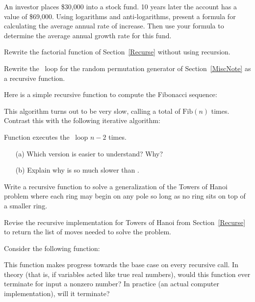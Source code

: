\begin{exercises}
\item
An investor places \$30,000 into a stock fund.
10 years later the account has a value of \$69,000.
Using logarithms and anti-logarithms, present a
formula for calculating the average annual rate of increase.
Then use your formula to determine the average annual growth rate for
this fund.

\item
Rewrite the factorial function of Section~\ref{Recurse} without
using recursion.

\item
Rewrite the \Cfor\ loop for the random permutation generator of
Section~\ref{MiscNote} as a recursive function.

\item
\label{FiboEx}
Here is a simple recursive function to compute the
Fibonacci sequence:


\noindent This algorithm turns out to be very slow, calling
 a total of \(\mbox{Fib}(n)\) times.
Contrast this with the following iterative
algorithm:


\noindent Function  executes the \Cfor\ loop \(n-2\)
times.
\begin{enumerate}
\item[(a)] Which version is easier to understand? Why?
\item[(b)] Explain why  is so much slower than .
\end{enumerate}

\item
Write a recursive function to solve a generalization
of the Towers of Hanoi problem where each ring may begin on any pole
so long as no ring sits on top of a smaller ring.

\item
Revise the recursive implementation for Towers of Hanoi from
Section~\ref{Recurse} to return the list of moves needed to solve the
problem.

\item
Consider the following function:


\noindent This function makes progress towards the base case on every
recursive call.
In theory (that is, if  variables acted like true real
numbers), would this function ever terminate for input  a
nonzero number?
In practice (an actual computer implementation), will it terminate?


\end{exercises}
